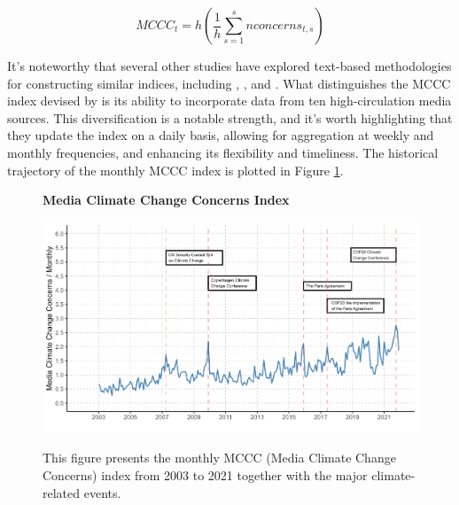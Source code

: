 \documentclass[12pt]{article}
\begin{document}
\begin{equation}
\label{mccc}
MCCC_t = h\left(\frac{1}{h}\sum^s_{s=1}nconcerns_{t,s} \right)
\end{equation}

It's noteworthy that several other studies have explored text-based methodologies for constructing similar indices, including \cite{engle2020hedging}, \cite{kapfhammer2020climate}, and \cite{faccini2021climate}. What distinguishes the MCCC index devised by \cite{ardia2022climate} is its ability to incorporate data from ten high-circulation media sources. This diversification is a notable strength, and it's worth highlighting that they update the index on a daily basis, allowing for aggregation at weekly and monthly frequencies, and enhancing its flexibility and timeliness. The historical trajectory of the monthly MCCC index is plotted in Figure \ref{fig: mccc}.

\begin{figure}[!ht]
\centering
\caption{\textbf{Media Climate Change Concerns Index}}
\includegraphics{image/mccc_plot.png}
\label{fig: mccc}
\caption*{\footnotesize{This figure presents the monthly MCCC (Media Climate Change Concerns) index from 2003 to 2021 together with the major climate-related events.}}
\end{figure}
\end{document}
